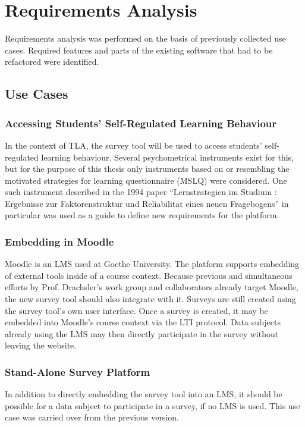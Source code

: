 \section{Requirements Analysis}
\label{section:requirements-analysis}

Requirements analysis was performed on the basis of previously collected use cases.
Required features and parts of the existing software that
had to be refactored were identified.

\subsection{Use Cases}

    \subsubsection{Accessing Students' Self-Regulated Learning Behaviour}
    In the context of TLA, the survey tool will be used to access students' self-regulated
    learning behaviour. Several psychometrical instruments exist for this, but
    for the purpose of this thesis only instruments based on or resembling
    the motivated strategies for learning questionnaire (MSLQ) were considered.
    One such instrument described in the 1994 paper 
    ``Lernstrategien im Studium : Ergebnisse zur Faktorenstruktur und Reliabilitat eines neuen Fragebogens'' \cite{lernstrategien-wild-schiefele}
    in particular was used as a guide to define new requirements for the platform.
     
     \subsubsection{Embedding in Moodle}
     \label{use-case:embedding}
     Moodle is an LMS used at Goethe University. The platform supports embedding of external
     tools inside of a course context. Because previous and simultaneous efforts by Prof. Drachsler's
     work group and collaborators already target Moodle, the new survey tool should also integrate
     with it. Surveys are still created using the survey tool's own user interface.
     Once a survey is created, it may be embedded into Moodle's course context via the LTI
     protocol. Data subjects already using the LMS may then directly participate in
     the survey without leaving the website.
 
     \subsubsection{Stand-Alone Survey Platform}
     In addition to directly embedding the survey tool into an LMS, it should be possible
     for a data subject to participate in a survey, if no LMS is used.
     This use case was carried over from the previous version.

